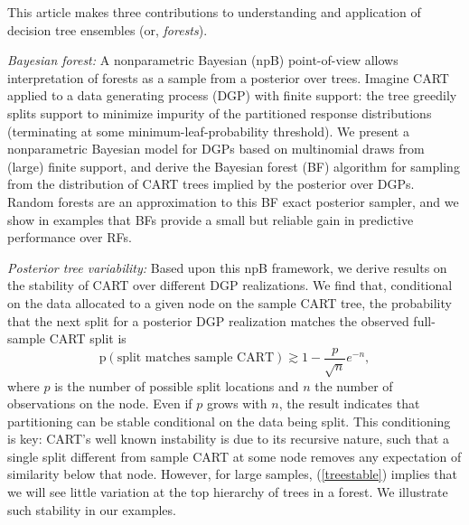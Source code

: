 \documentclass{article}
\begin{document}
This article makes three contributions to understanding and application of
decision tree ensembles (or, \textit{forests}).


\textit{Bayesian forest:}  A nonparametric Bayesian (npB) point-of-view
allows interpretation of forests as a sample from a posterior over trees.
Imagine CART applied to a data generating process (DGP) with finite support:
the tree greedily splits support to minimize impurity of the partitioned
response distributions (terminating at some minimum-leaf-probability
threshold). We present a nonparametric Bayesian model for DGPs based on
multinomial draws from (large) finite support, and derive the Bayesian forest
(BF) algorithm for sampling from the distribution of CART trees implied by the
posterior over DGPs.  Random forests are an approximation to this BF exact
posterior sampler, and we show in examples that BFs provide a small but
reliable gain in predictive performance over RFs.

\textit{Posterior tree variability:} Based upon this npB framework, we derive
results on the stability of CART  over different DGP realizations. We find
that, conditional on the data allocated to a given node on the sample CART tree,
the probability that the next split for a posterior DGP realization  matches
the observed full-sample CART split is
\begin{equation}\label{treestable}
\mathrm{p}\left(\text{split matches sample CART}\right) \gtrsim 1 - \frac{p}{\sqrt{n}} e^{-n},
\end{equation}
where $p$ is the number of possible split locations and $n$ the number of observations on the  node.  Even if $p$ grows with $n$, the result indicates that partitioning can be stable conditional on the data being split.  This conditioning is key: CART's well known instability is due to its recursive nature, such that a single split different from sample CART at some node removes any expectation of similarity  below that node.  However, for  large samples, (\ref{treestable}) implies that we will see little variation at the top hierarchy of  trees in a forest.  We illustrate such stability in our examples.
\end{document}
